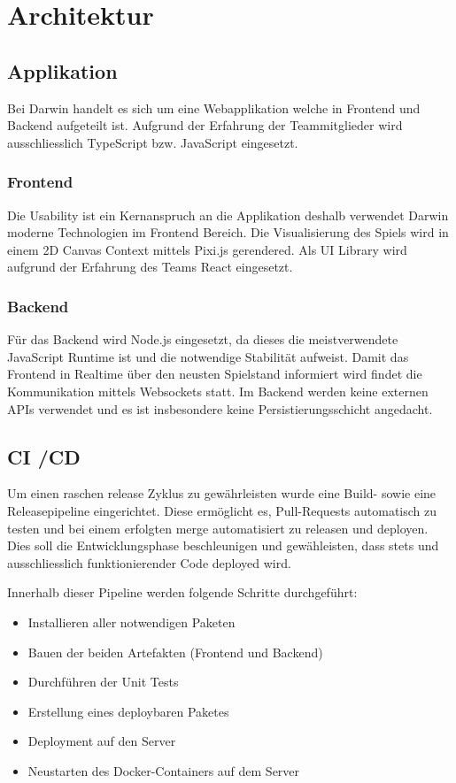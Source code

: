 \documentclass[a4paper, 11pt]{scrartcl}
\let\oldsection\section
\renewcommand\section{\clearpage\oldsection}
\begin{document}
\section{Architektur}
\subsection{Applikation}
Bei Darwin handelt es sich um eine Webapplikation welche in Frontend und Backend aufgeteilt ist.
Aufgrund der Erfahrung der Teammitglieder wird ausschliesslich TypeScript bzw. JavaScript eingesetzt.

\subsubsection{Frontend}
Die Usability ist ein Kernanspruch an die Applikation deshalb verwendet Darwin moderne Technologien im Frontend Bereich.
Die Visualisierung des Spiels wird in einem 2D Canvas Context mittels Pixi.js gerendered.
Als UI Library wird aufgrund der Erfahrung des Teams React eingesetzt.

\subsubsection{Backend}
Für das Backend wird Node.js eingesetzt, da dieses die meistverwendete JavaScript Runtime ist und die notwendige Stabilität aufweist.
Damit das Frontend in Realtime über den neusten Spielstand informiert wird findet die Kommunikation mittels Websockets statt.
Im Backend werden keine externen APIs verwendet und es ist insbesondere keine Persistierungsschicht angedacht.

\subsection{CI /CD}
Um einen raschen release Zyklus zu gewährleisten wurde eine Build- sowie eine Releasepipeline eingerichtet.
Diese ermöglicht es, Pull-Requests automatisch zu testen und bei einem erfolgten merge automatisiert zu releasen und deployen.
Dies soll die Entwicklungsphase beschleunigen und gewähleisten, dass stets und ausschliesslich funktionierender Code deployed wird.

Innerhalb dieser Pipeline werden folgende Schritte durchgeführt:
\begin{itemize}
  \item Installieren aller notwendigen Paketen
  \item Bauen der beiden Artefakten (Frontend und Backend)
  \item Durchführen der Unit Tests
  \item Erstellung eines deploybaren Paketes
  \item Deployment auf den Server
  \item Neustarten des Docker-Containers auf dem Server
\end{itemize}
\end{document}
